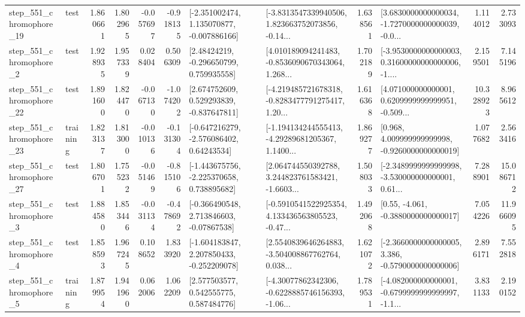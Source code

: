 \begin{tabular}{llrrrrllrlrr}
  step\_551\_chromophore\_19 &      test &      1.860661 &    1.802965 &     -0.057697 & -0.918135 &   [-2.351002474, 1.135070877, -0.007886166] &  [-3.8313547339940506, 1.823663752073856, -0.14... &       1.638561 &  [3.6830000000000034, -1.7270000000000039, -0.0... &            1.114012 &          2.733093 \\
   step\_551\_chromophore\_2 &      test &      1.928935 &    1.957339 &      0.028404 &  0.506309 &     [2.48424219, -0.296650799, 0.759935558] &  [4.010189094241483, -0.8536090670343064, 1.268... &       1.702189 &  [-3.9530000000000003, 0.31600000000000006, -1.... &            2.159501 &          7.145196 \\
  step\_551\_chromophore\_22 &      test &      1.891600 &    1.824470 &     -0.067130 & -1.074202 &    [2.674752609, 0.529293839, -0.837647811] &  [-4.219485721678318, -0.8283477791275417, 1.20... &       1.616368 &  [4.071000000000001, 0.6209999999999951, -0.509... &           10.328923 &          8.965612 \\
  step\_551\_chromophore\_23 &  training &      1.823137 &    1.813000 &     -0.010136 & -0.131304 &    [-0.647216279, -2.576086402, 0.64243534] &  [-1.194134244555413, -4.29289681205367, 1.1400... &       1.869277 &    [0.968, 4.009999999999998, -0.9260000000000019] &            1.077682 &          2.563416 \\
  step\_551\_chromophore\_27 &      test &      1.806701 &    1.755232 &     -0.051469 & -0.815106 &   [-1.443675756, -2.225370658, 0.738895682] &  [2.064744550392788, 3.244823761583421, -1.6603... &       1.508033 &  [-2.3489999999999998, -3.530000000000001, 0.61... &            7.288901 &         15.086712 \\
   step\_551\_chromophore\_3 &      test &      1.884580 &    1.853446 &     -0.031134 & -0.478692 &    [-0.366490548, 2.713846603, -0.07867538] &  [-0.5910541522925354, 4.133436563805523, -0.47... &       1.492068 &                [0.55, -4.061, -0.3880000000000017] &            7.054226 &         11.966095 \\
   step\_551\_chromophore\_4 &      test &      1.858593 &    1.967245 &      0.108652 &  1.833920 &   [-1.604183847, 2.207850433, -0.252209078] &  [2.5540839646264883, -3.504008867762764, 0.038... &       1.621072 &  [-2.3660000000000005, 3.386, -0.5790000000000006] &            2.896171 &          7.552818 \\
   step\_551\_chromophore\_5 &  training &      1.879954 &    1.941960 &      0.062006 &  1.062209 &     [2.577503577, 0.542555775, 0.587484776] &  [-4.30077862342306, -0.6228885746156393, -1.06... &       1.789531 &  [-4.082000000000001, -0.6799999999999997, -1.1... &            3.831133 &          2.190152 \\

\end{tabular}
